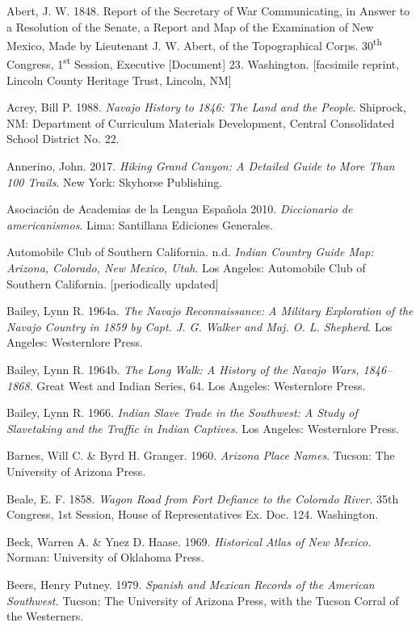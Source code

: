 \begin{hang}
	Abert, J. W. 1848. Report of the Secretary of War Communicating, in Answer to a Resolution of the Senate, a Report and Map of the Examination of New Mexico, Made by Lieutenant J. W. Abert, of the Topographical Corps.  30\textsuperscript{th} Congress, 1\textsuperscript{st} Session, Executive [Document] 23. Washington.  [facsimile reprint, Lincoln County Heritage Trust, Lincoln, NM]

	Acrey, Bill P.  1988.  \textit{Navajo History to 1846: The Land and the People}.  Shiprock, NM:  Department of Curriculum Materials Development, Central Consolidated School District No. 22.

	Annerino, John. 2017. \textit{Hiking Grand Canyon: A Detailed Guide to More Than 100 Trails}. New York: Skyhorse Publishing.

	Asociación de Academias de la Lengua Española 2010.  \textit{Diccionario de americanismos}.  Lima:  Santillana Ediciones Generales.

	Automobile Club of Southern California. n.d.  \textit{Indian Country Guide Map: Arizona, Colorado, New Mexico,  Utah}.  Los Angeles:  Automobile Club of Southern California.  [periodically updated]

	Bailey, Lynn R.  1964a.  \textit{The Navajo Reconnaissance: A Military Exploration of the Navajo Country in 1859 by Capt. J. G. Walker and Maj. O. L. Shepherd}.  Los Angeles:  Westernlore Press.

	Bailey, Lynn R. 1964b.  \textit{The Long Walk: A History of the Navajo Wars, 1846--1868}.  Great West and Indian Series, 64.  Los Angeles:  Westernlore Press.

	Bailey, Lynn R. 1966.  \textit{Indian Slave Trade in the Southwest: A Study of Slavetaking and the Traffic in Indian Captives}.  Los Angeles:  Westernlore Press.

	Barnes, Will C. \& Byrd H. Granger. 1960.  \textit{Arizona Place Names}.  Tucson:  The University of Arizona Press.

	Beale, E. F. 1858. \textit{ Wagon Road from Fort Defiance to the Colorado River}.  35th Congress, 1st Session, House of Representatives Ex. Doc. 124.  Washington.

	Beck, Warren A. \& Ynez D. Haase. 1969.  \textit{Historical Atlas of New Mexico.}  Norman:  University of Oklahoma Press.

	Beers, Henry Putney. 1979.  \textit{Spanish and Mexican Records of the American Southwest.}  Tucson:  The University of Arizona Press, with the Tucson Corral of the Westerners.


\end{hang}
